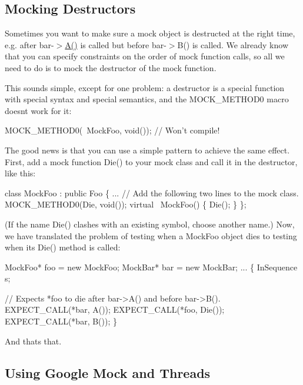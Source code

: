 \subsection*{Mocking Destructors}

Sometimes you want to make sure a mock object is destructed at the right time, e.\+g. after {\ttfamily bar-\/$>$\hyperlink{namespacetesting_a5e9134d655d2fc9323902348083282e7}{A()}} is called but before {\ttfamily bar-\/$>$B()} is called. We already know that you can specify constraints on the order of mock function calls, so all we need to do is to mock the destructor of the mock function.

This sounds simple, except for one problem\+: a destructor is a special function with special syntax and special semantics, and the {\ttfamily M\+O\+C\+K\+\_\+\+M\+E\+T\+H\+O\+D0} macro doesn\textquotesingle{}t work for it\+:


\begin{DoxyCode}
MOCK\_METHOD0(~MockFoo, void());  // Won't compile!
\end{DoxyCode}


The good news is that you can use a simple pattern to achieve the same effect. First, add a mock function {\ttfamily Die()} to your mock class and call it in the destructor, like this\+:


\begin{DoxyCode}
class MockFoo : public Foo \{
  ...
  // Add the following two lines to the mock class.
  MOCK\_METHOD0(Die, void());
  virtual ~MockFoo() \{ Die(); \}
\};
\end{DoxyCode}


(If the name {\ttfamily Die()} clashes with an existing symbol, choose another name.) Now, we have translated the problem of testing when a {\ttfamily Mock\+Foo} object dies to testing when its {\ttfamily Die()} method is called\+:


\begin{DoxyCode}
MockFoo* foo = new MockFoo;
MockBar* bar = new MockBar;
...
\{
  InSequence s;

  // Expects *foo to die after bar->A() and before bar->B().
  EXPECT\_CALL(*bar, A());
  EXPECT\_CALL(*foo, Die());
  EXPECT\_CALL(*bar, B());
\}
\end{DoxyCode}


And that\textquotesingle{}s that.

\subsection*{Using Google Mock and Threads}

